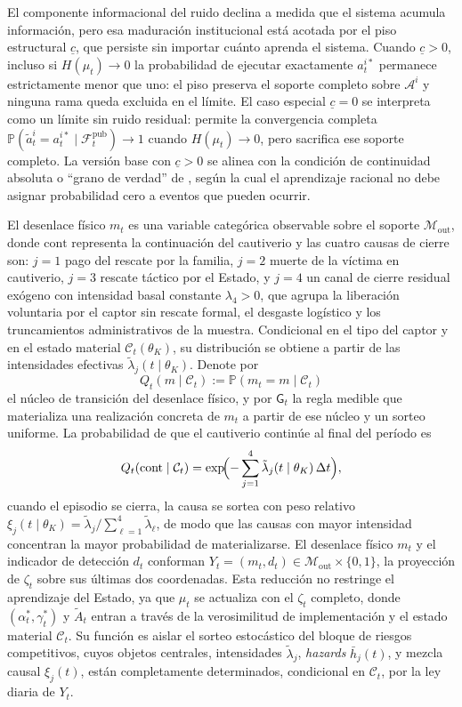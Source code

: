\documentclass[pdflatex,sn-mathphys-ay]{sn-jnl}
\theoremstyle{thmstyleone}
\theoremstyle{thmstyletwo}
\theoremstyle{thmstylethree}
\newcommand{\Prob}{\mathbb{P}}
\newcommand{\1}{\mathbf{1}}
\begin{document}
El componente informacional del ruido declina a medida que el sistema acumula información, pero esa maduración institucional está acotada por el piso estructural $\underline{c}$, que persiste sin importar cuánto aprenda el sistema. Cuando $\underline{c}>0$, incluso si $H(\mu_t)\to 0$ la probabilidad de ejecutar exactamente $a_t^{i\ast}$ permanece estrictamente menor que uno: el piso preserva el soporte completo sobre $\mathcal{A}^i$ y ninguna rama queda excluida en el límite. El caso especial $\underline{c}=0$ se interpreta como un límite sin ruido residual: permite la convergencia completa $\Prob(\tilde{a}_t^i=a_t^{i\ast}\mid\mathcal{F}_t^{\mathrm{pub}})\to 1$ cuando $H(\mu_t)\to 0$, pero sacrifica ese soporte completo. La versión base con $\underline{c}>0$ se alinea con la condición de continuidad absoluta o ``grano de verdad'' de \citet{KalaiLehrer1993}, según la cual el aprendizaje racional no debe asignar probabilidad cero a eventos que pueden ocurrir.

El desenlace físico $m_t$ es una variable categórica observable sobre el soporte $\mathcal{M}_{\mathrm{out}}$, donde $\mathrm{cont}$ representa la continuación del cautiverio y las cuatro causas de cierre son: $j=1$ pago del rescate por la familia, $j=2$ muerte de la víctima en cautiverio, $j=3$ rescate táctico por el Estado, y $j=4$ un canal de cierre residual exógeno con intensidad basal constante $\lambda_4>0$, que agrupa la liberación voluntaria por el captor sin rescate formal, el desgaste logístico y los truncamientos administrativos de la muestra. Condicional en el tipo del captor y en el estado material $\mathcal{C}_t(\theta_K)$, su distribución se obtiene a partir de las intensidades efectivas $\tilde{\lambda}_j(t\mid\theta_K)$. Denote por
\[
Q_t(m\mid\mathcal{C}_t):=\Prob(m_t=m\mid\mathcal{C}_t)
\]
el núcleo de transición del desenlace físico, y por $\mathsf{G}_t$ la regla medible que materializa una realización concreta de $m_t$ a partir de ese núcleo y un sorteo uniforme. La probabilidad de que el cautiverio continúe al final del período es
\[
Q_t(\mathrm{cont}\mid\mathcal{C}_t)=\exp\!\Bigl(-\sum_{j=1}^{4}\tilde{\lambda}_j(t\mid\theta_K)\,\Delta t\Bigr),
\]
cuando el episodio se cierra, la causa se sortea con peso relativo $\xi_j(t\mid\theta_K)=\tilde{\lambda}_j/\sum_{\ell=1}^{4}\tilde{\lambda}_\ell$, de modo que las causas con mayor intensidad concentran la mayor probabilidad de materializarse. El desenlace físico $m_t$ y el indicador de detección $d_t$ conforman $Y_t=(m_t,d_t)\in\mathcal{M}_{\mathrm{out}}\times\{0,1\}$, la proyección de $\zeta_t$ sobre sus últimas dos coordenadas. Esta reducción no restringe el aprendizaje del Estado, ya que $\mu_t$ se actualiza con el $\zeta_t$ completo, donde $(\alpha_t^\ast,\gamma_t^\ast)$ y $\tilde{A}_t$ entran a través de la verosimilitud de implementación y el estado material $\mathcal{C}_t$. Su función es aislar el sorteo estocástico del bloque de riesgos competitivos, cuyos objetos centrales, intensidades $\tilde{\lambda}_j$, \textit{hazards} $\bar{h}_j(t)$, y mezcla causal $\xi_j(t)$, están completamente determinados, condicional en $\mathcal{C}_t$, por la ley diaria de $Y_t$.
\end{document}
